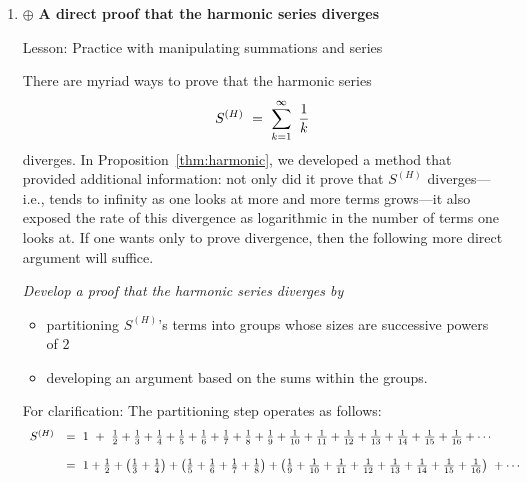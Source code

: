 \begin{enumerate}
\medskip\item
$\oplus$ {\bf A direct proof that the harmonic series diverges}

{\sc Lesson:}
Practice with manipulating summations and series

\smallskip

There are myriad ways to prove that the harmonic series
\[ S^{(H)} \ = \ \sum_{k=1}^\infty \ {1 \over k} \]
diverges.  In Proposition~\ref{thm:harmonic}, we developed a method that provided additional information: not only did it prove that $S^{(H)}$ diverges---i.e., tends to infinity as one looks at more and more terms grows---it also exposed the rate of this divergence as logarithmic in the number of terms one looks at.  If one wants only to prove divergence, then the following more direct argument will suffice.

\medskip

{\em Develop a proof that the harmonic series diverges by
\begin{itemize}
\item
partitioning $S^{(H)}$'s terms into groups whose sizes are successive powers of $2$
\medskip\item
developing an argument based on the sums within the groups.
\end{itemize}
}

\smallskip

For clarification:
The partitioning step operates as follows:
{\footnotesize
\[ 
\begin{array}{ll}
S^{(H)} 
             & = \ 1 \ + \ {1 \over 2} + {1 \over 3} + {1 \over 4} + {1 \over 5} + {1 \over 6}+ {1 \over 7} + {1 \over 8} + {1 \over 9} + {1 \over 10}+ {1 \over 11}  +{1 \over 12} + {1 \over 13} + {1 \over 14} + {1 \over 15} + {1 \over 16} + \cdots \\
             & \\
              & = \ 1  + {1 \over 2} + \left(  {1 \over 3}   +  {1 \over 4}  \right) + \left( {1 \over 5} + {1 \over 6}+ {1 \over 7}  +  {1 \over 8} \right) + \left( {1 \over 9} + {1 \over 10}+ {1 \over 11}  +{1 \over 12} + {1 \over 13} + {1 \over 14} + {1 \over 15} + {1 \over 16} \right) \ +\cdots
\end{array} \]
}



\end{enumerate}
